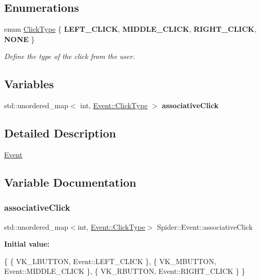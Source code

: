 \subsection*{Enumerations}
\begin{DoxyCompactItemize}
\item 
\mbox{\label{namespace_spider_1_1_event_ae178d39ebb8937d04ffe6ead8f306fd0}} 
enum \hyperlink{namespace_spider_1_1_event_ae178d39ebb8937d04ffe6ead8f306fd0}{Click\+Type} \{ {\bfseries L\+E\+F\+T\+\_\+\+C\+L\+I\+CK}, 
{\bfseries M\+I\+D\+D\+L\+E\+\_\+\+C\+L\+I\+CK}, 
{\bfseries R\+I\+G\+H\+T\+\_\+\+C\+L\+I\+CK}, 
{\bfseries N\+O\+NE}
 \}\begin{DoxyCompactList}\small\item\em Define the type of the click from the user. \end{DoxyCompactList}
\end{DoxyCompactItemize}
\subsection*{Variables}
\begin{DoxyCompactItemize}
\item 
std\+::unordered\+\_\+map$<$ int, \hyperlink{namespace_spider_1_1_event_ae178d39ebb8937d04ffe6ead8f306fd0}{Event\+::\+Click\+Type} $>$ {\bfseries associative\+Click}
\end{DoxyCompactItemize}


\subsection{Detailed Description}
\hyperlink{namespace_spider_1_1_event}{Event} 

\subsection{Variable Documentation}
\mbox{\label{namespace_spider_1_1_event_a18a7153c12e999d71c1490dbc9c464d8}} 
\subsubsection{\texorpdfstring{associative\+Click}{associativeClick}}
{\footnotesize\ttfamily std\+::unordered\+\_\+map$<$int, \hyperlink{namespace_spider_1_1_event_ae178d39ebb8937d04ffe6ead8f306fd0}{Event\+::\+Click\+Type}$>$ Spider\+::\+Event\+::associative\+Click}

{\bfseries Initial value\+:}
\begin{DoxyCode}
\{
        \{ VK\_LBUTTON, Event::LEFT\_CLICK \},
        \{ VK\_MBUTTON, Event::MIDDLE\_CLICK \},
        \{ VK\_RBUTTON, Event::RIGHT\_CLICK \}
    \}
\end{DoxyCode}
